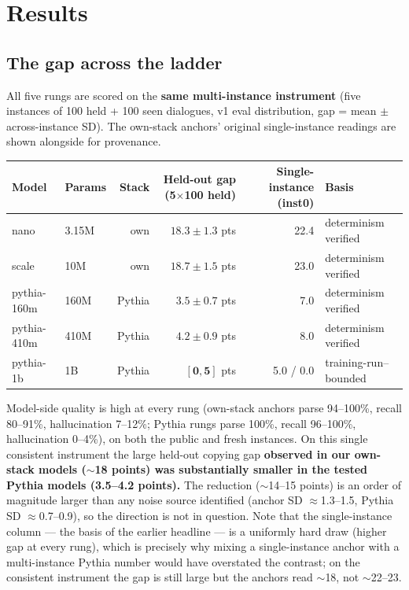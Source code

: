 \documentclass[11pt]{article}
\begin{document}
\section{Results}\label{sec:results}

\subsection{The gap across the ladder}\label{sec:ladder}

All five rungs are scored on the \textbf{same multi-instance instrument} (five instances of 100 held + 100 seen dialogues, v1 eval distribution, gap = mean $\pm$ across-instance SD). The own-stack anchors' original single-instance readings are shown alongside for provenance.

 \begin{center}
\begin{tabular}{llrrrl}
\toprule
Model & Params & Stack & Held-out gap (5$\times$100 held) & Single-instance (inst0) & Basis \\
\midrule
nano & 3.15M & own & $\mathbf{18.3}\pm\mathbf{1.3}$ pts & 22.4 & determinism verified \\
scale & 10M & own & $\mathbf{18.7}\pm\mathbf{1.5}$ pts & 23.0 & determinism verified \\
pythia-160m & 160M & Pythia & $\mathbf{3.5}\pm\mathbf{0.7}$ pts & 7.0 & determinism verified \\
pythia-410m & 410M & Pythia & $\mathbf{4.2}\pm\mathbf{0.9}$ pts & 8.0 & determinism verified \\
pythia-1b & 1B & Pythia & $\mathbf{[0,5]}$ pts & 5.0 / 0.0 & training-run--bounded \\
\bottomrule
\end{tabular}
\end{center}

Model-side quality is high at every rung (own-stack anchors parse 94--100\%, recall 80--91\%, hallucination 7--12\%; Pythia rungs parse 100\%, recall 96--100\%, hallucination 0--4\%), on both the public and fresh instances. On this single consistent instrument the large held-out copying gap \textbf{observed in our own-stack models ($\sim$18 points) was substantially smaller in the tested Pythia models (3.5--4.2 points).} The reduction ($\sim$14--15 points) is an order of magnitude larger than any noise source identified (anchor SD $\approx$1.3--1.5, Pythia SD $\approx$0.7--0.9), so the direction is not in question. Note that the single-instance column --- the basis of the earlier headline --- is a uniformly hard draw (higher gap at every rung), which is precisely why mixing a single-instance anchor with a multi-instance Pythia number would have overstated the contrast; on the consistent instrument the gap is still large but the anchors read $\sim$18, not $\sim$22--23.
\end{document}
